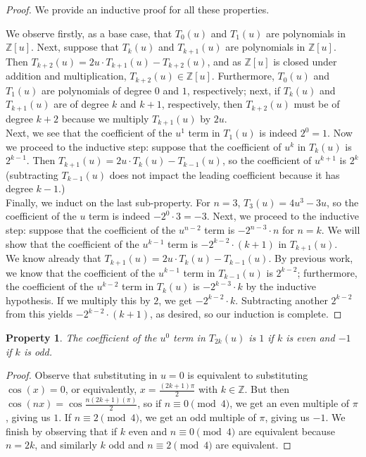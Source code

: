 \documentclass[12pt, letterpaper]{article} %
\newtheorem{theorem}{Property}
\begin{document}
\begin{proof} We provide an inductive proof for all these properties.

We observe firstly, as a base case, that $T_0(u)$ and $T_1(u)$ are polynomials in $\mathbb{Z}[u]$. Next, suppose that $T_{k}(u)$ and $T_{k+1}(u)$ are polynomials in $\mathbb{Z}[u]$. Then $T_{k+2}(u) = 2u \cdot T_{k+1}(u) - T_{k+2}(u)$, and as $\mathbb{Z}[u]$ is closed under addition and multiplication, $T_{k+2}(u) \in \mathbb{Z}[u]$. Furthermore, $T_0(u)$ and $T_1(u)$ are polynomials of degree $0$ and $1$, respectively; next, if $T_k(u)$ and $T_{k+1}(u)$ are of degree $k$ and $k+1$, respectively, then $T_{k+2}(u)$ must be of degree $k+2$ because we multiply $T_{k+1}(u)$ by $2u$. \\

Next, we see that the coefficient of the $u^1$ term in $T_1(u)$ is indeed $2^0 = 1$. Now we proceed to the inductive step: suppose that the coefficient of $u^k$ in $T_k(u)$ is $2^{k-1}$. Then $T_{k+1}(u) = 2u \cdot T_k(u) - T_{k-1}(u)$, so the coefficient of $u^{k+1}$ is $2^k$ (subtracting $T_{k-1}(u)$ does not impact the leading coefficient because it has degree $k-1$.)\\

Finally, we induct on the last sub-property. For $n = 3$, $T_3(u) = 4u^3 - 3u$, so the coefficient of the $u$ term is indeed $-2^0 \cdot 3 = -3$. Next, we proceed to the inductive step: suppose that the coefficient of the $u^{n-2}$ term is $-2^{n-3}\cdot n$ for $n = k$. We will show that the coefficient of the $u^{k-1}$ term is $-2^{k-2}\cdot (k+1)$ in $T_{k+1}(u)$.\\

We know already that $T_{k+1}(u) = 2u \cdot T_k(u) - T_{k-1}(u)$. By previous work, we know that the coefficient of the $u^{k-1}$ term in $T_{k-1}(u)$ is $2^{k-2}$; furthermore, the coefficient of the $u^{k-2}$ term in $T_{k}(u)$ is $-2^{k-3} \cdot k$ by the inductive hypothesis. If we multiply this by $2$, we get $-2^{k-2} \cdot k$. Subtracting another $2^{k-2}$ from this yields $-2^{k-2} \cdot (k+1)$, as desired, so our induction is complete.
\end{proof}

\begin{theorem}
The coefficient of the $u^0$ term in $T_{2k}(u)$ is $1$ if $k$ is even and $-1$ if $k$ is odd.
\end{theorem}

\begin{proof}
Observe that substituting in $u = 0$ is equivalent to substituting $\cos (x) = 0$, or equivalently, $x = \frac{(2k+1)\pi}{2}$ with $k \in \mathbb{Z}$. But then $\cos (nx) = \cos \frac{n(2k+1)(\pi)}{2}$, so if $n\equiv 0 \pmod{4}$, we get an even multiple of $\pi$, giving us $1$. If $n \equiv 2 \pmod{4}$, we get an odd multiple of $\pi$, giving us $-1$. We finish by observing that if $k$ even and $n \equiv 0 \pmod{4}$ are equivalent because $n = 2k$, and similarly $k$ odd and $n \equiv 2 \pmod{4}$ are equivalent.
\end{proof}
\end{document}
